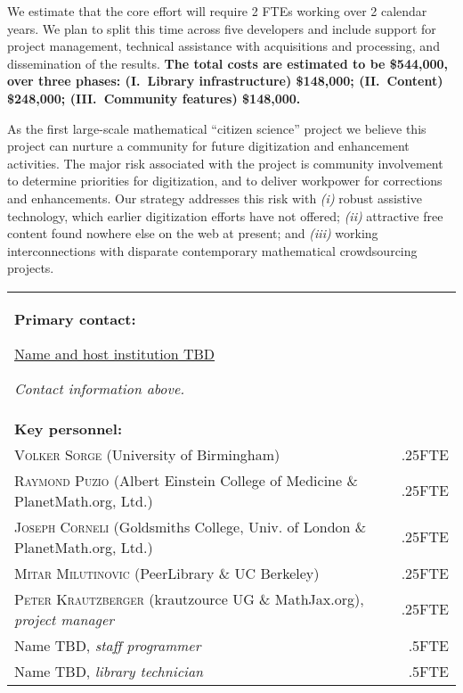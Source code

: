 \documentclass[10pt,letterpaper]{article}
\begin{document}
We estimate that the core effort will require 2 FTEs
working over 2 calendar years.  We plan to split this time
across five developers and include support for project management,
technical assistance with acquisitions and processing, and
dissemination of the results.  \textbf{The total costs are estimated
  to be \$544,000, over three phases: (I.~Library infrastructure)
  \$148,000; (II.~Content) \$248,000; (III.~Community features)
  \$148,000.}

As the first large-scale mathematical ``citizen science'' project we
believe this project can nurture a community for future digitization
and enhancement activities.  The major risk associated with the
project is community involvement to determine priorities for
digitization, and to deliver workpower for corrections and
enhancements.  Our strategy addresses this risk with \emph{(i)} robust
assistive technology, which earlier digitization efforts have not
offered; \emph{(ii)} attractive free content found nowhere else on the
web at present; and \emph{(iii)} working interconnections with
disparate contemporary mathematical crowdsourcing projects.


\bigskip

\begin{tabular}{p{}r}
\textbf{Primary contact:} \par
\ul{Name and host institution TBD}
\par \emph{Contact information above.} &  \\[1cm]
\textbf{Key personnel:} &\\
\textsc{Volker Sorge} (University of Birmingham) &.25FTE \\
\textsc{Raymond Puzio} (Albert Einstein College of Medicine \& PlanetMath.org, Ltd.) & .25FTE \\
\textsc{Joseph Corneli} (Goldsmiths College, Univ. of London \& PlanetMath.org, Ltd.) &.25FTE \\
\textsc{Mitar Milutinovic} (PeerLibrary \& UC Berkeley)  &.25FTE \\
\textsc{Peter Krautzberger} (krautzource UG \& MathJax.org), \emph{project manager}&.25FTE\\
Name TBD, \emph{staff programmer}   &.5FTE \\
Name TBD, \emph{library technician}  &.5FTE \\
\end{tabular}
\end{document}
